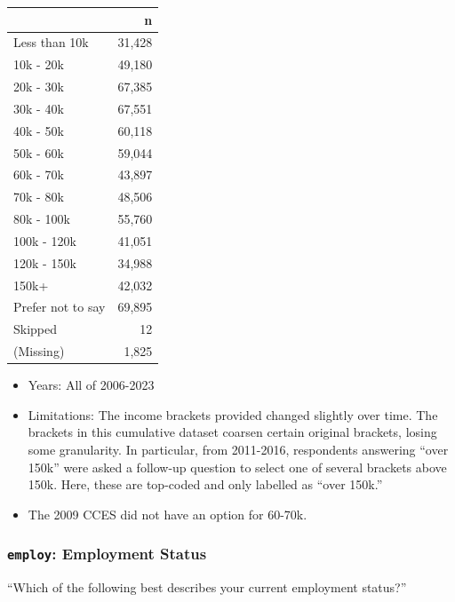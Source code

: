 \documentclass[10pt,article,oneside]{memoir}
\theoremstyle{definition}
\begin{document}
\begin{table}[H]
\centering
\begin{tabular}[t]{lr}
\toprule
 & n\\
\midrule
Less than 10k & 31,428\\
10k - 20k & 49,180\\
20k - 30k & 67,385\\
30k - 40k & 67,551\\
40k - 50k & 60,118\\
50k - 60k & 59,044\\
60k - 70k & 43,897\\
70k - 80k & 48,506\\
80k - 100k & 55,760\\
100k - 120k & 41,051\\
120k - 150k & 34,988\\
150k+ & 42,032\\
Prefer not to say & 69,895\\
Skipped & 12\\
(Missing) & 1,825\\
\bottomrule
\end{tabular}
\end{table}

\begin{itemize}
\tightlist
\item
  Years: All of 2006-2023
\item
  Limitations: The income brackets provided changed slightly over time.
  The brackets in this cumulative dataset coarsen certain original
  brackets, losing some granularity. In particular, from 2011-2016,
  respondents answering ``over 150k'' were asked a follow-up question to
  select one of several brackets above 150k. Here, these are top-coded
  and only labelled as ``over 150k.''
\item
  The 2009 CCES did not have an option for 60-70k.
\end{itemize}

\subsubsection{\texorpdfstring{\texttt{employ}: Employment
Status}{employ: Employment Status}}\label{employ-employment-status}

``Which of the following best describes your current employment
status?''
\end{document}
